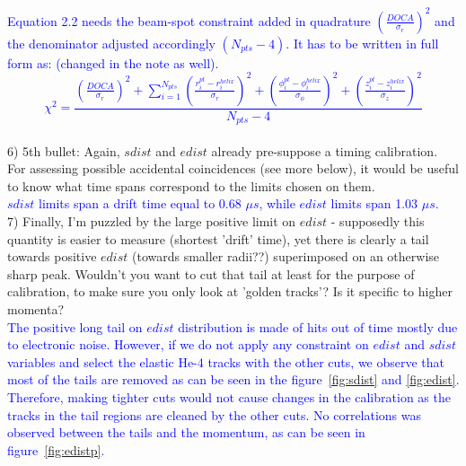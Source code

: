 \textcolor{blue}{Equation 2.2 needs the beam-spot constraint added in
quadrature $\left(\frac{DOCA}{\sigma_r}\right)^2$ and the denominator adjusted
accordingly $(N_{pts}-4)$. It has to be written in full form as: (changed in 
the note as well).  }\\

\textcolor{blue}{
\begin{equation}
   \chi^{2} = \frac{\displaystyle \left(\frac{DOCA}{\sigma_r}\right)^2 
       + \sum_{i = 1}^{ N_{pts}} \left(\frac{r^{pt}_{i} 
      - r^{helix}_{i} }{\sigma_{r}}\right)^{2}  + \left( \frac{\phi^{pt}_{i} - 
      \phi^{helix}_{i} }{\sigma_{\phi}}\right)^{2} + \left( \frac{z^{pt}_{i} - 
   z^{helix}_{i} }{\sigma_{z} } \right)^{2}}{N_{pts} - 4}
\end{equation}
}\\


6) 5th bullet: Again, $sdist$ and $edist$ already pre-suppose a timing 
calibration.  For assessing possible accidental coincidences (see more below), 
it would be useful to know what time spans correspond to the limits chosen on 
them.\\
\textcolor{blue}{ $sdist$ limits span a drift time equal to 0.68 $\mu s$, while 
$edist$ limits span 1.03 $\mu s$.}\\

7) Finally, I'm puzzled by the large positive limit on $edist$ - supposedly this 
quantity is easier to measure (shortest 'drift' time), yet there is clearly a 
tail towards positive $edist$ (towards smaller radii??) superimposed on an 
otherwise sharp peak. Wouldn't you want to cut that tail at least for the 
purpose of calibration, to make sure you only look at 'golden tracks'? Is it 
specific to higher momenta? \\
 \textcolor{blue}{
The positive long tail on $edist$ distribution is made of hits out of time 
mostly due to electronic noise. However, if we do not apply any constraint on 
$edist$ and $sdist$ variables and select the elastic He-4 tracks with the other 
cuts, we observe that most of the tails are removed as can be seen in the 
figure~\ref{fig:sdist} and \ref{fig:edist}. Therefore, making tighter cuts 
would not cause changes in the calibration as the tracks in the tail regions 
are cleaned by the other cuts.  No correlations was observed between the tails 
and the momentum, as can be seen in figure~\ref{fig:edistp}.}\\


